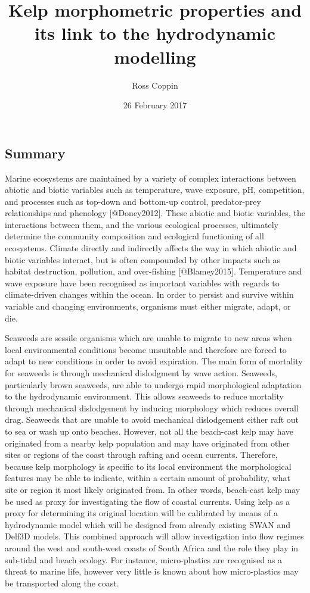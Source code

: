 \documentclass[]{article}
\title{Kelp morphometric properties and its link to the hydrodynamic modelling}
\author{Ross Coppin}
\date{26 February 2017}
\begin{document}
\maketitle

{
\setcounter{tocdepth}{2}
\tableofcontents
}
\subsection{Summary}\label{summary}

Marine ecosystems are maintained by a variety of complex interactions
between abiotic and biotic variables such as temperature, wave exposure,
pH, competition, and processes such as top-down and bottom-up control,
predator-prey relationships and phenology {[}@Doney2012{]}. These
abiotic and biotic variables, the interactions between them, and the
various ecological processes, ultimately determine the community
composition and ecological functioning of all ecosystems. Climate
directly and indirectly affects the way in which abiotic and biotic
variables interact, but is often compounded by other impacts such as
habitat destruction, pollution, and over-fishing {[}@Blamey2015{]}.
Temperature and wave exposure have been recognised as important
variables with regards to climate-driven changes within the ocean. In
order to persist and survive within variable and changing environments,
organisms must either migrate, adapt, or die.

Seaweeds are sessile organisms which are unable to migrate to new areas
when local environmental conditions become unsuitable and therefore are
forced to adapt to new conditions in order to avoid expiration. The main
form of mortality for seaweeds is through mechanical dislodgment by wave
action. Seaweeds, particularly brown seaweeds, are able to undergo rapid
morphological adaptation to the hydrodynamic environment. This allows
seaweeds to reduce mortality through mechanical dislodgement by inducing
morphology which reduces overall drag. Seaweeds that are unable to avoid
mechanical dislodgement either raft out to sea or wash up onto beaches.
However, not all the beach-cast kelp may have originated from a nearby
kelp population and may have originated from other sites or regions of
the coast through rafting and ocean currents. Therefore, because kelp
morphology is specific to its local environment the morphological
features may be able to indicate, within a certain amount of
probability, what site or region it most likely originated from. In
other words, beach-cast kelp may be used as proxy for investigating the
flow of coastal currents. Using kelp as a proxy for determining its
original location will be calibrated by means of a hydrodynamic model
which will be designed from already existing SWAN and Delf3D models.
This combined approach will allow investigation into flow regimes around
the west and south-west coasts of South Africa and the role they play in
sub-tidal and beach ecology. For instance, micro-plastics are recognised
as a threat to marine life, however very little is known about how
micro-plastics may be transported along the coast.
\end{document}
